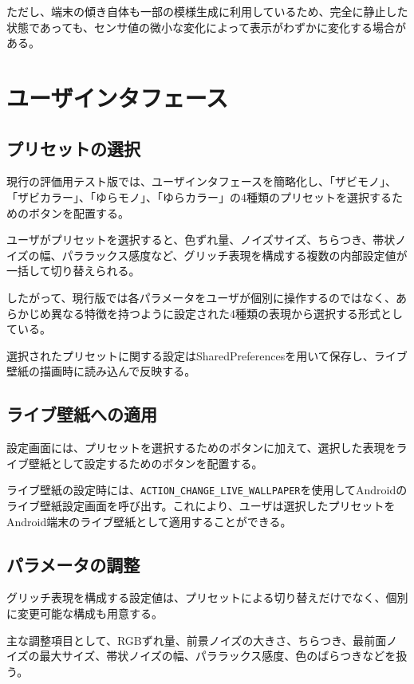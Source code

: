 ただし、端末の傾き自体も一部の模様生成に利用しているため、完全に静止した状態であっても、センサ値の微小な変化によって表示がわずかに変化する場合がある。


\section{ユーザインタフェース}

\subsection{プリセットの選択}

現行の評価用テスト版では、ユーザインタフェースを簡略化し、「ザビモノ」、「ザビカラー」、「ゆらモノ」、「ゆらカラー」の4種類のプリセットを選択するためのボタンを配置する。

ユーザがプリセットを選択すると、色ずれ量、ノイズサイズ、ちらつき、帯状ノイズの幅、パララックス感度など、グリッチ表現を構成する複数の内部設定値が一括して切り替えられる。

したがって、現行版では各パラメータをユーザが個別に操作するのではなく、あらかじめ異なる特徴を持つように設定された4種類の表現から選択する形式としている。

選択されたプリセットに関する設定はSharedPreferencesを用いて保存し、ライブ壁紙の描画時に読み込んで反映する。

\subsection{ライブ壁紙への適用}

設定画面には、プリセットを選択するためのボタンに加えて、選択した表現をライブ壁紙として設定するためのボタンを配置する。

ライブ壁紙の設定時には、\texttt{ACTION_CHANGE_LIVE_WALLPAPER}を使用してAndroidのライブ壁紙設定画面を呼び出す。これにより、ユーザは選択したプリセットをAndroid端末のライブ壁紙として適用することができる。


\subsection{パラメータの調整}

グリッチ表現を構成する設定値は、プリセットによる切り替えだけでなく、個別に変更可能な構成も用意する。

主な調整項目として、RGBずれ量、前景ノイズの大きさ、ちらつき、最前面ノイズの最大サイズ、帯状ノイズの幅、パララックス感度、色のばらつきなどを扱う。

